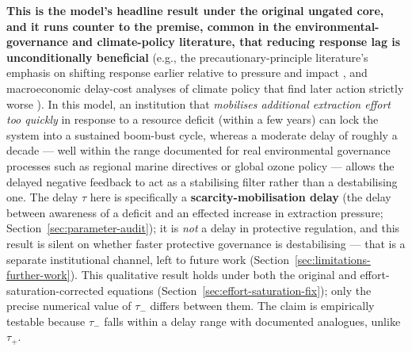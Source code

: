 \documentclass[twocolumn,10pt]{article}
\begin{document}
\textbf{This is the model's headline result under the original ungated core, and it runs counter to the premise, common in the environmental-governance and climate-policy literature, that reducing response lag is unconditionally beneficial} (e.g., the precautionary-principle literature's emphasis on shifting response earlier relative to pressure and impact \cite{hocherman2025}, and macroeconomic delay-cost analyses of climate policy that find later action strictly worse \cite{mckibbin2014}). In this model, an institution that \emph{mobilises additional extraction effort too quickly} in response to a resource deficit (within a few years) can lock the system into a sustained boom-bust cycle, whereas a moderate delay of roughly a decade — well within the range documented for real environmental governance processes such as regional marine directives or global ozone policy — allows the delayed negative feedback to act as a stabilising filter rather than a destabilising one. The delay $\tau$ here is specifically a \textbf{scarcity-mobilisation delay} (the delay between awareness of a deficit and an effected increase in extraction pressure; Section~\ref{sec:parameter-audit}); it is \emph{not} a delay in protective regulation, and this result is silent on whether faster protective governance is destabilising — that is a separate institutional channel, left to future work (Section~\ref{sec:limitations-further-work}). This qualitative result holds under both the original and effort-saturation-corrected equations (Section~\ref{sec:effort-saturation-fix}); only the precise numerical value of $\tau_-$ differs between them. The claim is empirically testable because $\tau_-$ falls within a delay range with documented analogues, unlike $\tau_+$.
\end{document}
